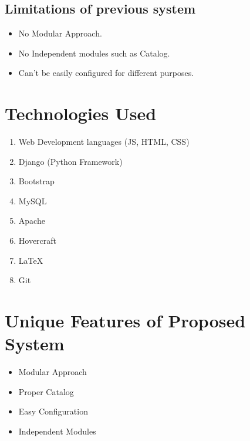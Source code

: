  \subsection{Limitations of previous system }
\begin{itemize}
\item No Modular Approach. 

\item No Independent modules such as Catalog.

\item Can't be easily configured for different purposes.


\end{itemize}
\section{Technologies Used}
\begin{enumerate}
\item Web Development languages (JS, HTML, CSS)
\item Django (Python Framework)
\item Bootstrap
\item MySQL
\item Apache
\item Hovercraft
\item LaTeX
\item Git

\end{enumerate}

\section{Unique Features of Proposed System}
\begin{itemize}
	\item Modular Approach
	\item Proper Catalog
	\item Easy Configuration
	\item Independent Modules
	\end{itemize}

\newpage


